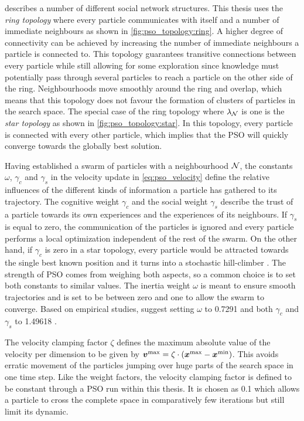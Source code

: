 \citeauthor{engelbrecht_fundamentals_2006} describes a number of different social network structures.
This thesis uses the \emph{ring topology} where every particle communicates with itself and a number of immediate neighbours as shown in \cref{fig:pso_topology:ring}.
A higher degree of connectivity can be achieved by increasing the number of immediate neighbours a particle is connected to.
This topology guarantees transitive connections between every particle while still allowing for some exploration since knowledge must potentially pass through several particles to reach a particle on the other side of the ring.
Neighbourhoods move smoothly around the ring and overlap, which means that this topology does not favour the formation of clusters of particles in the search space.
The special case of the ring topology where $\lambda_{\operatorname{\mathcal{N}}}$ is one is the \emph{star topology} as shown in \cref{fig:pso_topology:star}.
In this topology, every particle is connected with every other particle, which implies that the PSO will quickly converge towards the globally best solution.

Having established a swarm of particles with a neighbourhood $\operatorname{\mathcal{N}}$, the constants $\omega$, $\gamma_c$ and $\gamma_s$ in the velocity update in \cref{eq:pso_velocity} define the relative influences of the different kinds of information a particle has gathered to its trajectory.
The cognitive weight $\gamma_c$ and the social weight $\gamma_s$ describe the trust of a particle towards its own experiences and the experiences of its neighbours.
If $\gamma_s$ is equal to zero, the communication of the particles is ignored and every particle performs a local optimization independent of the rest of the swarm.
On the other hand, if $\gamma_c$ is zero in a star topology, every particle would be attracted towards the single best known position and it turns into a stochastic hill-climber \cite{engelbrecht_fundamentals_2006}.
The strength of PSO comes from weighing both aspects, so a common choice is to set both constants to similar values.
The inertia weight $\omega$ is meant to ensure smooth trajectories and is set to be between zero and one to allow the swarm to converge.
Based on empirical studies, \citeauthor{eberhart_comparing_2000} suggest setting $\omega$ to 0.7291 and both $\gamma_c$ and $\gamma_s$ to 1.49618 \cite{eberhart_comparing_2000}.

The velocity clamping factor $\zeta$ defines the maximum absolute value of the velocity per dimension to be given by $\bm{v^\text{max}} = \zeta \cdot ( \bm{x^\text{max}} - \bm{x^\text{min}} )$.
This avoids erratic movement of the particles jumping over huge parts of the search space in one time step.
Like the weight factors, the velocity clamping factor is defined to be constant through a PSO run within this thesis.
It is chosen as 0.1 which allows a particle to cross the complete space in comparatively few iterations but still limit its dynamic.


